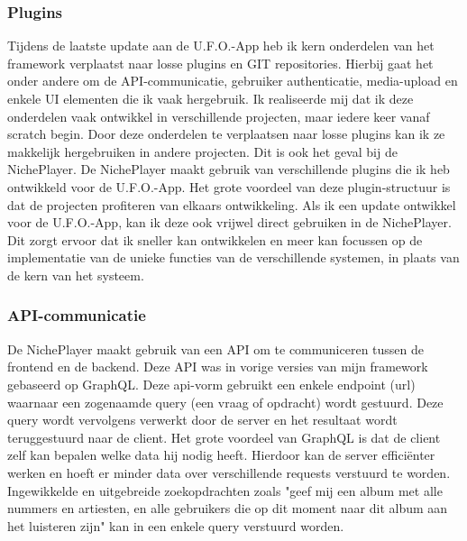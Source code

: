 \subsubsection*{Plugins}
Tijdens de laatste update aan de U.F.O.-App heb ik kern onderdelen van het framework verplaatst naar losse plugins en GIT repositories. Hierbij gaat het onder andere om de API-communicatie, gebruiker authenticatie, media-upload en enkele UI elementen die ik vaak hergebruik. Ik realiseerde mij dat ik deze onderdelen vaak ontwikkel in verschillende projecten, maar iedere keer vanaf scratch begin. Door deze onderdelen te verplaatsen naar losse plugins kan ik ze makkelijk hergebruiken in andere projecten. Dit is ook het geval bij de NichePlayer. De NichePlayer maakt gebruik van verschillende plugins die ik heb ontwikkeld voor de U.F.O.-App. Het grote voordeel van deze plugin-structuur is dat de projecten profiteren van elkaars ontwikkeling. Als ik een update ontwikkel voor de U.F.O.-App, kan ik deze ook vrijwel direct gebruiken in de NichePlayer. Dit zorgt ervoor dat ik sneller kan ontwikkelen en meer kan focussen op de implementatie van de unieke functies van de verschillende systemen, in plaats van de kern van het systeem.

\subsubsection*{API-communicatie}
De NichePlayer maakt gebruik van een API om te communiceren tussen de frontend en de backend. Deze API was in vorige versies van mijn framework gebaseerd op GraphQL. Deze api-vorm gebruikt een enkele endpoint (url) waarnaar een zogenaamde query (een vraag of opdracht) wordt gestuurd. Deze query wordt vervolgens verwerkt door de server en het resultaat wordt teruggestuurd naar de client. Het grote voordeel van GraphQL is dat de client zelf kan bepalen welke data hij nodig heeft. Hierdoor kan de server efficiënter werken en hoeft er minder data over verschillende requests verstuurd te worden. Ingewikkelde en uitgebreide zoekopdrachten zoals "geef mij een album met alle nummers en artiesten, en alle gebruikers die op dit moment naar dit album aan het luisteren zijn" kan in een enkele query verstuurd worden.

